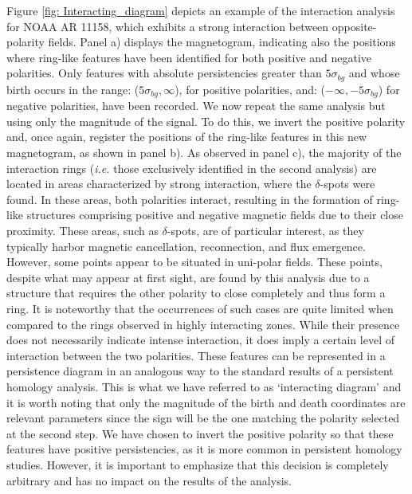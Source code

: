 Figure \ref{fig: Interacting_diagram} depicts an example of the interaction analysis for NOAA AR 11158, which exhibits a strong interaction between opposite-polarity fields. Panel a) displays the magnetogram, indicating also the positions where ring-like features have been identified for both positive and negative polarities. Only features with absolute persistencies greater than $5\sigma _ {bg}$ and whose birth occurs in the range: ($5\sigma _ {bg}, \infty$), for positive polarities, and: ($-\infty, -5\sigma _ {bg}$) for negative polarities, have been recorded. We now repeat the same analysis but using only the magnitude of the signal. To do this, we invert the positive polarity and, once again, register the positions of the ring-like features in this new magnetogram, as shown in panel b). As observed in panel c), the majority of the interaction rings (\textit{i.e.} those exclusively identified in the second analysis) are located in areas characterized by strong interaction, where the $\delta$-spots were found. In these areas, both polarities interact, resulting in the formation of ring-like structures comprising positive and negative magnetic fields due to their close proximity. These areas, such as  $\delta$-spots, are of particular interest, as they typically harbor magnetic cancellation, reconnection, and flux emergence.  However, some points appear to be situated in uni-polar fields. These points, despite what may appear at first sight, are found by this analysis due to a structure that requires the other polarity to close completely and thus form a ring. It is noteworthy that the occurrences of such cases are quite limited when compared to the rings observed in highly interacting zones. While their presence does not necessarily indicate intense interaction, it does imply a certain level of interaction between the two polarities. These features can be represented in a persistence diagram in an analogous way to the standard results of a persistent homology analysis. This is what we have referred to as `interacting diagram' and it is worth noting that only the magnitude of the birth and death coordinates are relevant parameters since the sign will be the one matching the polarity selected at the second step. We have chosen to invert the positive polarity so that these features have positive persistencies, as it is more common in persistent homology studies. However, it is important to emphasize that this decision is completely arbitrary and has no impact on the results of the analysis.  

